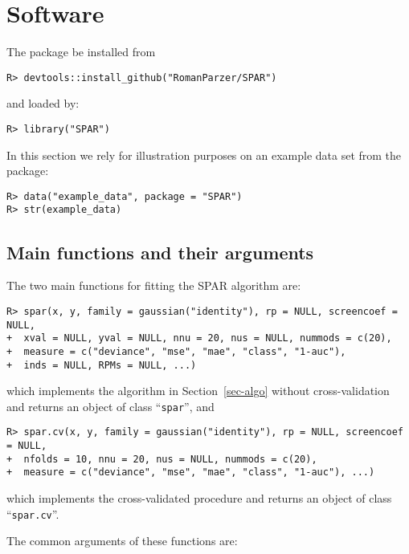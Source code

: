 \documentclass[
  article]{jss}
\begin{document}
\section{Software}\label{sec-software}

The package be installed from 

\begin{verbatim}
R> devtools::install_github("RomanParzer/SPAR")
\end{verbatim}

and loaded by:

\begin{verbatim}
R> library("SPAR")
\end{verbatim}

In this section we rely for illustration purposes on an example data set
from the package:

\begin{verbatim}
R> data("example_data", package = "SPAR")
R> str(example_data)
\end{verbatim}

\subsection{Main functions and their
arguments}\label{main-functions-and-their-arguments}

The two main functions for fitting the SPAR algorithm are:

\begin{verbatim}
R> spar(x, y, family = gaussian("identity"), rp = NULL, screencoef = NULL,
+  xval = NULL, yval = NULL, nnu = 20, nus = NULL, nummods = c(20),
+  measure = c("deviance", "mse", "mae", "class", "1-auc"),
+  inds = NULL, RPMs = NULL, ...)
\end{verbatim}

which implements the algorithm in Section~\ref{sec-algo} without
cross-validation and returns an object of class ``\texttt{spar}'', and

\begin{verbatim}
R> spar.cv(x, y, family = gaussian("identity"), rp = NULL, screencoef = NULL,
+  nfolds = 10, nnu = 20, nus = NULL, nummods = c(20),
+  measure = c("deviance", "mse", "mae", "class", "1-auc"), ...)
\end{verbatim}

which implements the cross-validated procedure and returns an object of
class ``\texttt{spar.cv}''.

The common arguments of these functions are:
\end{document}
